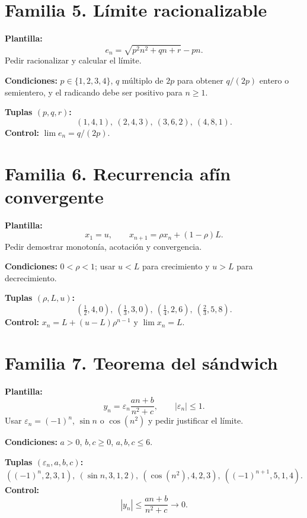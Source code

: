 \documentclass[12pt,letterpaper]{article}
\newcommand{\familia}[2]{\section*{Familia #1. #2}}
\newcommand{\campo}[1]{\textcolor{azul}{\textbf{#1}}}
\begin{document}
\familia{5}{Límite racionalizable}
\campo{Plantilla:}
\[
 e_n=\sqrt{p^2n^2+qn+r}-pn.
\]
Pedir racionalizar y calcular el límite.\par
\campo{Condiciones:} $p\in\{1,2,3,4\}$, $q$ múltiplo de $2p$ para obtener
$q/(2p)$ entero o semientero, y el radicando debe ser positivo para $n\geq1$.\par
\campo{Tuplas $(p,q,r)$:}
\[
 (1,4,1),\ (2,4,3),\ (3,6,2),\ (4,8,1).
\]
\campo{Control:} $\displaystyle\lim e_n=q/(2p)$.

\familia{6}{Recurrencia afín convergente}
\campo{Plantilla:}
\[
 x_1=u,\qquad x_{n+1}=\rho x_n+(1-\rho)L.
\]
Pedir demostrar monotonía, acotación y convergencia.\par
\campo{Condiciones:} $0<\rho<1$; usar $u<L$ para crecimiento y $u>L$ para
decrecimiento.\par
\campo{Tuplas $(\rho,L,u)$:}
\[
 \left(\tfrac12,4,0\right),\
 \left(\tfrac13,3,0\right),\
 \left(\tfrac14,2,6\right),\
 \left(\tfrac23,5,8\right).
\]
\campo{Control:} $x_n=L+(u-L)\rho^{n-1}$ y $\lim x_n=L$.

\familia{7}{Teorema del sándwich}
\campo{Plantilla:}
\[
 y_n=\varepsilon_n\frac{an+b}{n^2+c},
\qquad |\varepsilon_n|\leq1.
\]
Usar $\varepsilon_n=(-1)^n$, $\sin n$ o $\cos(n^2)$ y pedir justificar el límite.\par
\campo{Condiciones:} $a>0$, $b,c\geq0$, $a,b,c\leq6$.\par
\campo{Tuplas $(\varepsilon_n,a,b,c)$:}
\[
 ((-1)^n,2,3,1),\ (\sin n,3,1,2),\ (\cos(n^2),4,2,3),\ ((-1)^{n+1},5,1,4).
\]
\campo{Control:}
\[
 |y_n|\leq\frac{an+b}{n^2+c}\longrightarrow0.
\]
\end{document}
